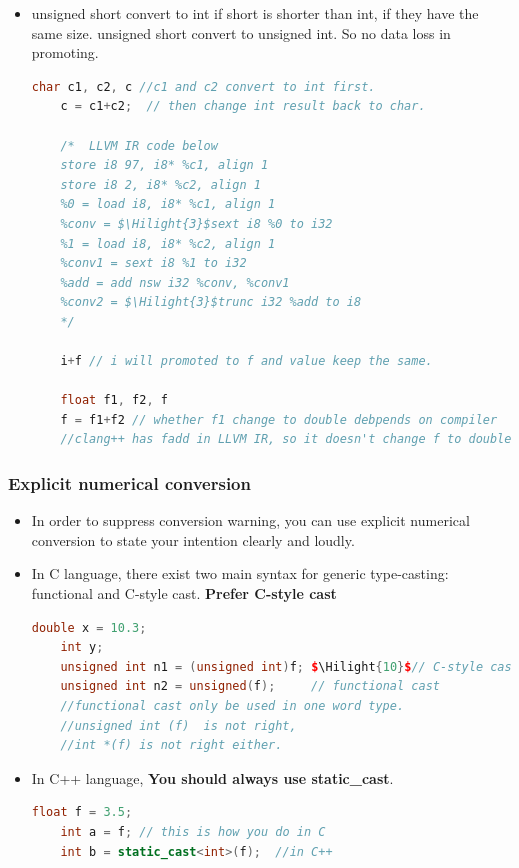 \documentclass[a4paper,11pt,twoside]{book}
\newcommand{\Hilight}[1]{\makebox[0pt][l]{\color{yellow}\rule[-3pt]{#1em}{11pt}}}
\newcommand{\Hilight}[1]{}
\begin{document}
\begin{itemize}
	\item unsigned short convert to int if short is shorter than int, if they have the same size. unsigned short convert to unsigned int.  So no data loss in promoting.
	\begin{lstlisting}[frame=single, language=c++, mathescape=true]
	char c1, c2, c //c1 and c2 convert to int first.
	c = c1+c2;  // then change int result back to char.
	
	/*  LLVM IR code below
	store i8 97, i8* %c1, align 1
	store i8 2, i8* %c2, align 1
	%0 = load i8, i8* %c1, align 1
	%conv = $\Hilight{3}$sext i8 %0 to i32
	%1 = load i8, i8* %c2, align 1
	%conv1 = sext i8 %1 to i32
	%add = add nsw i32 %conv, %conv1
	%conv2 = $\Hilight{3}$trunc i32 %add to i8
	*/
	
	i+f // i will promoted to f and value keep the same.
	
	float f1, f2, f
	f = f1+f2 // whether f1 change to double debpends on compiler
	//clang++ has fadd in LLVM IR, so it doesn't change f to double.
	\end{lstlisting}
\end{itemize}

\subsubsection{Explicit numerical conversion}
\begin{itemize}
	\item In order to suppress conversion warning, you can use explicit numerical conversion to state your intention clearly and loudly.
	
	\item In C language, there exist two main syntax for generic type-casting: functional and C-style cast.  \textbf{Prefer C-style cast}
	
	\begin{lstlisting}[frame=single, language=c++, mathescape=true]
	double x = 10.3;
	int y;
	unsigned int n1 = (unsigned int)f; $\Hilight{10}$// C-style cast
	unsigned int n2 = unsigned(f);     // functional cast
	//functional cast only be used in one word type.
	//unsigned int (f)  is not right,
	//int *(f) is not right either.
	\end{lstlisting}
	
	\item In C++ language, \textbf{You should always use static\_cast}. 
	
	\begin{lstlisting}[frame=single, language=c++, mathescape=true]
	float f = 3.5; 
	int a = f; // this is how you do in C 
	int b = static_cast<int>(f);  //in C++
	\end{lstlisting}
\end{itemize}
\end{document}
